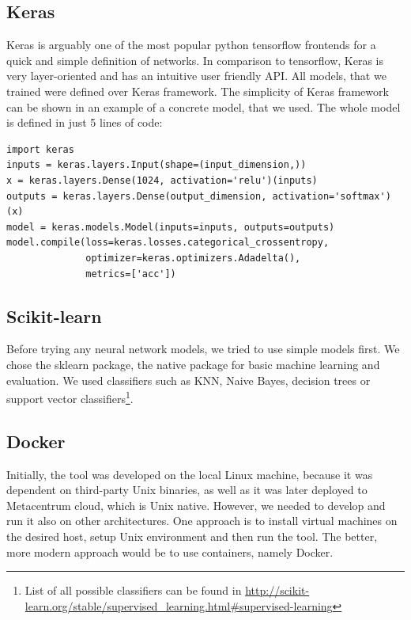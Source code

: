 \subsection{Keras}

Keras\cite{keras} is arguably one of the most popular python tensorflow frontends for a quick and simple definition of networks. In comparison to tensorflow, Keras is very layer-oriented and has an intuitive user friendly API. All models, that we trained were defined over Keras framework. The simplicity of Keras framework can be shown in an example of a concrete model, that we used. The whole model is defined in just 5 lines of code:

\begin{verbatim}
import keras
inputs = keras.layers.Input(shape=(input_dimension,))
x = keras.layers.Dense(1024, activation='relu')(inputs)
outputs = keras.layers.Dense(output_dimension, activation='softmax')(x)
model = keras.models.Model(inputs=inputs, outputs=outputs)
model.compile(loss=keras.losses.categorical_crossentropy,
              optimizer=keras.optimizers.Adadelta(),
              metrics=['acc'])

\end{verbatim}

\subsection{Scikit-learn}
 
Before trying any neural network models, we tried to use simple models first. We chose the sklearn\cite{scikit} package, the native package for basic machine learning and evaluation. We used classifiers such as KNN, Naive Bayes, decision trees or support vector classifiers\footnote{List of all possible classifiers can be found in \url{http://scikit-learn.org/stable/supervised\_learning.html\#supervised-learning}}. 

\subsection{Docker}

Initially, the tool was developed on the local Linux machine, because it was dependent on third-party Unix binaries, as well as it was later deployed to Metacentrum cloud, which is Unix native. However, we needed to develop and run it also on other architectures. One approach is to install virtual machines on the desired host, setup Unix environment and then run the tool. The better, more modern approach would be to use containers, namely Docker\cite{docker}.

